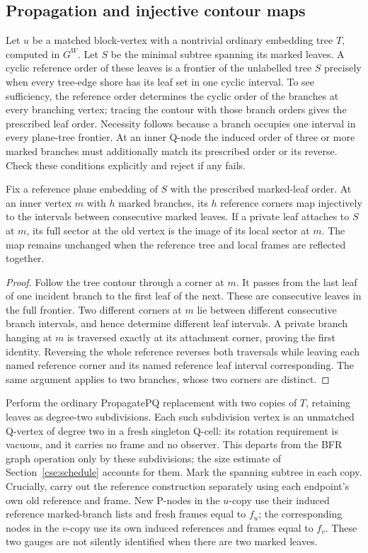 \subsection{Propagation and injective contour maps}

Let $u$ be a matched block-vertex with a nontrivial ordinary embedding
tree $T$, computed in $G^W$. Let $S$ be the minimal subtree spanning its
marked leaves. A cyclic reference order of these leaves is a frontier
of the unlabelled tree $S$ precisely when every tree-edge shore has its
leaf set in one cyclic interval. To see sufficiency, the reference order
determines the cyclic order of the branches at every branching vertex;
tracing the contour with those branch orders gives the prescribed leaf
order. Necessity follows because a branch occupies one interval in every
plane-tree frontier. At an inner Q-node the induced order of three or
more marked branches must additionally match its prescribed order or its
reverse. Check these conditions explicitly and reject if any fails.

\begin{lemma}
\label{cse:contour}
Fix a reference plane embedding of $S$ with the prescribed marked-leaf
order. At an inner vertex $m$ with $h$ marked branches, its $h$ reference
corners map injectively to the intervals between consecutive marked
leaves. If a private leaf attaches to $S$ at $m$, its full sector at the
old vertex is the image of its local sector at $m$. The map remains
unchanged when the reference tree and local frames are reflected together.
\end{lemma}
\begin{proof}
Follow the tree contour through a corner at $m$. It passes from the last
leaf of one incident branch to the first leaf of the next. These are
consecutive leaves in the full frontier. Two different corners at $m$
lie between different consecutive branch intervals, and hence determine
different leaf intervals. A private branch hanging at $m$ is traversed
exactly at its attachment corner, proving the first identity. Reversing
the whole reference reverses both traversals while leaving each named
reference corner and its named reference leaf interval corresponding.
The same argument applies to two branches, whose two corners are distinct.
\end{proof}

Perform the ordinary PropagatePQ replacement with two copies of $T$,
retaining leaves as degree-two subdivisions. Each such subdivision vertex
is an unmatched Q-vertex of degree two in a fresh singleton Q-cell: its
rotation requirement is vacuous, and it carries no frame and no observer.
This departs from the BFR graph operation only by these subdivisions; the
size estimate of Section~\ref{cse:schedule} accounts for them. Mark the
spanning subtree
in each copy. Crucially, carry out the reference construction separately
using each endpoint's own old reference and frame. New P-nodes in the
$u$-copy use their induced reference marked-branch lists and fresh frames
equal to $f_u$; the corresponding nodes in the $v$-copy use its own
induced references and frames equal to $f_v$. These two gauges are not
silently identified when there are two marked leaves.

